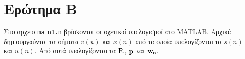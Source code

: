 \section{Ερώτημα Β}\label{section:B}
Στο αρχείο \texttt{main1.m} βρίσκονται οι σχετικοί υπολογισμοί στο MATLAB.
Αρχικά δημιουργούνται τα σήματα $v(n)$ και $x(n)$ από τα οποία υπολογίζονται τα $s(n)$ και $u(n)$.
Από αυτά υπολογίζονται τα $\mathbf{R}$, $\mathbf{p}$ και $\mathbf{w_o}$.
